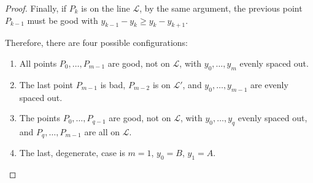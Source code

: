 \documentclass[10pt,a4paper]{amsart}
\begin{document}
\begin{proof}
Finally, if $P_k$ is on the line $\mathcal{L}$, by the same
argument, the previous point $P_{k-1}$ must be good with
$y_{k-1}-y_k\geq y_k-y_{k+1}$.

Therefore, there are four possible configurations:
\begin{enumerate}
\item All points $P_0,\ldots, P_{m-1}$ are good, not on
$\mathcal{L}$, with $y_0,\ldots, y_m$ evenly spaced out.
\item The last point $P_{m-1}$ is bad, $P_{m-2}$ is on
$\mathcal{L}'$, and $y_0,\ldots, y_{m-1}$ are evenly spaced out.
\item The points $P_0,\ldots, P_{q-1}$ are good, not on
$\mathcal{L}$, with $y_0,\ldots, y_q$ evenly spaced out, and
$P_q,\ldots, P_{m-1}$ are all on $\mathcal{L}$.
\item The last, degenerate, case is $m=1$, $y_0=B$, $y_1=A$.
\end{enumerate}





\begin{figure}[htp]
\centering
\hfill
\hfill

\end{figure}


\end{proof}
\end{document}
